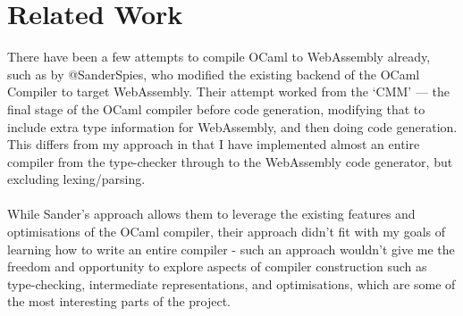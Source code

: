 



\section{Related Work}

There have been a few attempts to compile OCaml to WebAssembly already, such as by @SanderSpies\cite{Awbfo}, who modified the existing backend of the OCaml Compiler to target WebAssembly. Their attempt worked from the `CMM' --- the final stage of the OCaml compiler before code generation, modifying that to include extra type information for WebAssembly, and then doing code generation. This differs from my approach in that I have implemented almost an entire compiler from the type-checker through to the WebAssembly code generator, but excluding lexing/parsing.
\\\\
While Sander's approach allows them to leverage the existing features and optimisations of the OCaml compiler, their approach didn't fit with my goals of learning how to write an entire compiler - such an approach wouldn't give me the freedom and opportunity to explore aspects of compiler construction such as type-checking, intermediate representations, and optimisations, which are some of the most interesting parts of the project.